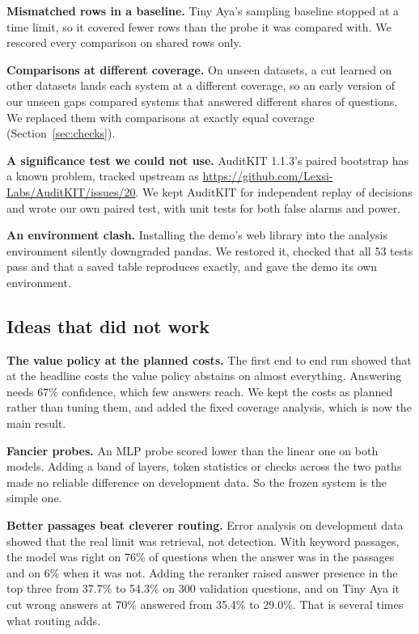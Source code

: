 \documentclass[11pt,a4paper]{article}
\begin{document}
\textbf{Mismatched rows in a baseline.} Tiny Aya's sampling baseline stopped at a time limit, so it covered fewer rows than the probe it was compared with. We rescored every comparison on shared rows only.

\textbf{Comparisons at different coverage.} On unseen datasets, a cut learned on other datasets lands each system at a different coverage, so an early version of our unseen gaps compared systems that answered different shares of questions. We replaced them with comparisons at exactly equal coverage (Section~\ref{sec:checks}).

\textbf{A significance test we could not use.} AuditKIT 1.1.3's paired bootstrap has a known problem, tracked upstream as \url{https://github.com/Lexsi-Labs/AuditKIT/issues/20}. We kept AuditKIT for independent replay of decisions and wrote our own paired test, with unit tests for both false alarms and power.

\textbf{An environment clash.} Installing the demo's web library into the analysis environment silently downgraded pandas. We restored it, checked that all 53 tests pass and that a saved table reproduces exactly, and gave the demo its own environment.

\subsection{Ideas that did not work}
\label{sec:failed}

\textbf{The value policy at the planned costs.} The first end to end run showed that at the headline costs the value policy abstains on almost everything. Answering needs 67\% confidence, which few answers reach. We kept the costs as planned rather than tuning them, and added the fixed coverage analysis, which is now the main result.

\textbf{Fancier probes.} An MLP probe scored lower than the linear one on both models. Adding a band of layers, token statistics or checks across the two paths made no reliable difference on development data. So the frozen system is the simple one.

\textbf{Better passages beat cleverer routing.} Error analysis on development data showed that the real limit was retrieval, not detection. With keyword passages, the model was right on 76\% of questions when the answer was in the passages and on 6\% when it was not. Adding the reranker raised answer presence in the top three from 37.7\% to 54.3\% on 300 validation questions, and on Tiny Aya it cut wrong answers at 70\% answered from 35.4\% to 29.0\%. That is several times what routing adds.
\end{document}
